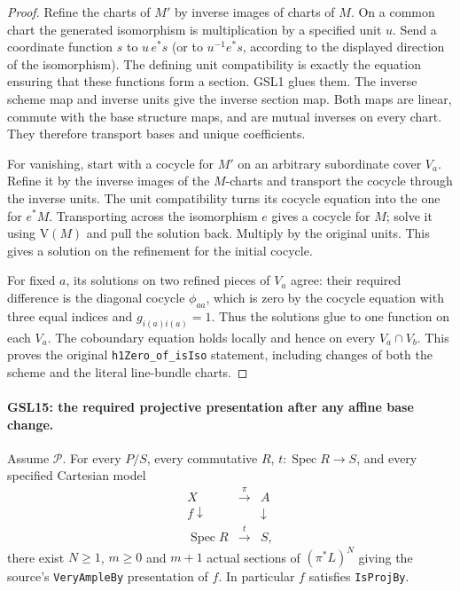 \begin{proof}
Refine the charts of $M'$ by inverse images of charts of $M$.
On a common chart the generated isomorphism is multiplication by
a specified unit $u$.  Send a coordinate function $s$ to
$u\,e^*s$ (or to $u^{-1}e^*s$, according to the displayed direction
of the isomorphism).  The defining unit compatibility is exactly
the equation ensuring that these functions form a section.
GSL1 glues them.  The inverse scheme map and inverse units give
the inverse section map.  Both maps are linear, commute with the
base structure maps, and are mutual inverses on every chart.
They therefore transport bases and unique coefficients.

For vanishing, start with a cocycle for $M'$ on an arbitrary
subordinate cover $V_a$.  Refine it by the inverse images of
the $M$-charts and transport the cocycle through the inverse units.
The unit compatibility turns its cocycle equation into the one
for $e^*M$.  Transporting across the isomorphism $e$ gives a
cocycle for $M$; solve it using $\mathrm V(M)$ and pull the
solution back.  Multiply by the original units.  This gives a
solution on the refinement for the initial cocycle.

For fixed $a$, its solutions on two refined pieces of $V_a$
agree: their required difference is the diagonal cocycle
$\phi_{aa}$, which is zero by the cocycle equation with three
equal indices and $g_{i(a)i(a)}=1$.  Thus the solutions glue to
one function on each $V_a$.  The coboundary equation holds
locally and hence on every $V_a\cap V_b$.  This proves the
original \texttt{h1Zero\_of\_isIso} statement, including changes
of both the scheme and the literal line-bundle charts.
\end{proof}

\paragraph{GSL15: the required projective presentation after any affine base change.}
\label{claim:GSL15}
Assume $\mathcal P$.  For every $P/S$, every commutative $R$,
$t:\operatorname{Spec}R\to S$, and every specified Cartesian model
\[
 \begin{array}{ccc}
 X&\xrightarrow{\pi}&A\\
 f\downarrow&&\downarrow\\
 \operatorname{Spec}R&\xrightarrow{t}&S,
 \end{array}
\]
there exist $N\ge1$, $m\ge0$ and $m+1$ actual sections of
$(\pi^*L)^N$ giving the source's \texttt{VeryAmpleBy} presentation
of $f$.  In particular $f$ satisfies \texttt{IsProjBy}.

